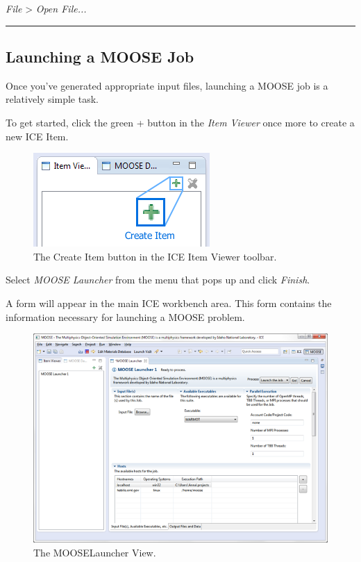 \emph{File} \textgreater{} \emph{Open File...}

\begin{center}\rule{0.5\linewidth}{\linethickness}\end{center}

\subsection{Launching a MOOSE Job}\label{launching-a-moose-job}

Once you've generated appropriate input files, launching a MOOSE job is
a relatively simple task.

To get started, click the green + button in the \emph{Item Viewer}
once more to create a new ICE Item.

\begin{figure}[htbp]
\centering
\includegraphics{figures/ICE_CreateItem.png}
\caption{The Create Item button in the ICE Item Viewer toolbar.}
\end{figure}

Select \emph{MOOSE Launcher} from the menu that pops up and click
\emph{Finish}.

A form will appear in the main ICE workbench area. This form contains
the information necessary for launching a MOOSE problem.

\begin{figure}[htbp]
\centering
\includegraphics[width=\textwidth]{figures/ICE_MOOSELauncher.png}
\caption{The MOOSELauncher View. }
\end{figure}

